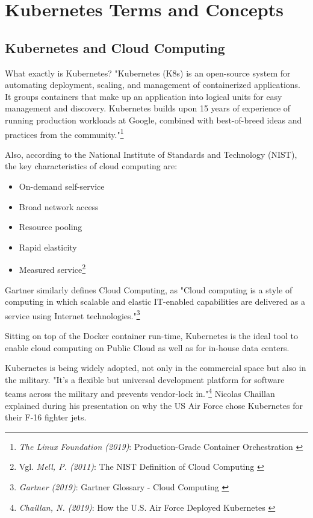 %
%

\pagebreak
\section{Kubernetes Terms and Concepts}

\onehalfspacing

\subsection{Kubernetes and Cloud Computing}

What exactly is Kubernetes? "Kubernetes (K8s) is an open-source system for automating deployment, scaling, and management of containerized applications.
It groups containers that make up an application into logical units for easy management and discovery. Kubernetes builds upon 15 years of experience of running production workloads at Google, combined with best-of-breed ideas and practices from the community."\footnote{\textit{The Linux Foundation (2019)}: Production-Grade Container Orchestration \cite{kubernetes}}

Also, according to the National Institute of Standards and Technology (NIST), the key characteristics of cloud computing are: 
\begin{itemize}
\item On-demand self-service
\item Broad network access
\item Resource pooling
\item Rapid elasticity
\item Measured service\footnote{Vgl. \textit{Mell, P. (2011)}: The NIST Definition of Cloud Computing \cite{sp800-145}}
\end{itemize}

Gartner similarly defines Cloud Computing, as "Cloud computing is a style of computing in which scalable and elastic IT-enabled capabilities are delivered as a service using Internet technologies."\footnote{\textit{Gartner (2019)}: Gartner Glossary - Cloud Computing \cite{gartnerGlossary}}

Sitting on top of the Docker container run-time, Kubernetes is the ideal tool to enable cloud computing on Public Cloud as well as for in-house data centers.

Kubernetes is being widely adopted, not only in the commercial space but also in the military. "It’s a flexible but universal development platform for software teams across the military and prevents vendor-lock in."\footnote{\textit{Chaillan, N. (2019)}: How the U.S. Air Force Deployed Kubernetes \cite{airForce}} Nicolas Chaillan explained during his presentation on why the US Air Force chose Kubernetes for their F-16 fighter jets.

